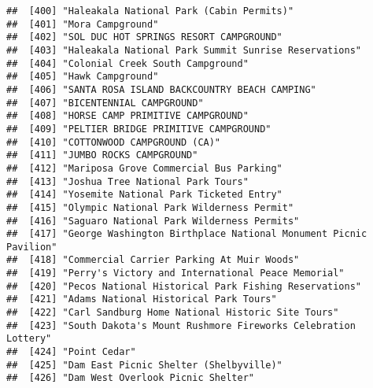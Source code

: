 \documentclass[
]{article}
\begin{document}
\begin{verbatim}
##  [400] "Haleakala National Park (Cabin Permits)"                                             
##  [401] "Mora Campground"                                                                     
##  [402] "SOL DUC HOT SPRINGS RESORT CAMPGROUND"                                               
##  [403] "Haleakala National Park Summit Sunrise Reservations"                                 
##  [404] "Colonial Creek South Campground"                                                     
##  [405] "Hawk Campground"                                                                     
##  [406] "SANTA ROSA ISLAND BACKCOUNTRY BEACH CAMPING"                                         
##  [407] "BICENTENNIAL CAMPGROUND"                                                             
##  [408] "HORSE CAMP PRIMITIVE CAMPGROUND"                                                     
##  [409] "PELTIER BRIDGE PRIMITIVE CAMPGROUND"                                                 
##  [410] "COTTONWOOD CAMPGROUND (CA)"                                                          
##  [411] "JUMBO ROCKS CAMPGROUND"                                                              
##  [412] "Mariposa Grove Commercial Bus Parking"                                               
##  [413] "Joshua Tree National Park Tours"                                                     
##  [414] "Yosemite National Park Ticketed Entry"                                               
##  [415] "Olympic National Park Wilderness Permit"                                             
##  [416] "Saguaro National Park Wilderness Permits"                                            
##  [417] "George Washington Birthplace National Monument Picnic Pavilion"                      
##  [418] "Commercial Carrier Parking At Muir Woods"                                            
##  [419] "Perry's Victory and International Peace Memorial"                                    
##  [420] "Pecos National Historical Park Fishing Reservations"                                 
##  [421] "Adams National Historical Park Tours"                                                
##  [422] "Carl Sandburg Home National Historic Site Tours"                                     
##  [423] "South Dakota's Mount Rushmore Fireworks Celebration Lottery"                         
##  [424] "Point Cedar"                                                                         
##  [425] "Dam East Picnic Shelter (Shelbyville)"                                               
##  [426] "Dam West Overlook Picnic Shelter"                                                    

\end{verbatim}
\end{document}
